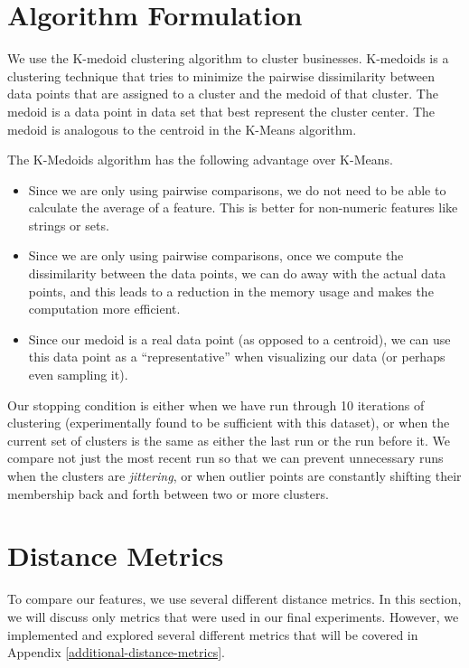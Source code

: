 \documentclass{article}
\begin{document}
\section{Algorithm Formulation}
We use the K-medoid clustering algorithm to cluster businesses.
K-medoids is a clustering technique that tries to minimize the pairwise dissimilarity between data points that are assigned to a cluster and the medoid of that cluster.
The medoid is a data point in data set that best represent the cluster center.
The medoid is analogous to the centroid in the K-Means algorithm.

The K-Medoids algorithm has the following advantage over K-Means.
\begin{itemize} 
	\setlength\itemsep{0.1cm}
	\item Since we are only using pairwise comparisons, we do not need to be able to calculate the average of a feature. This is better for non-numeric features like strings or sets.
    \item Since we are only using pairwise comparisons, once we compute the dissimilarity between the data points, we can do away with the actual data points, and this leads to a reduction in the memory usage and makes the computation more efficient.
    \item Since our medoid is a real data point (as opposed to a centroid), we can use this data point as a ``representative'' when visualizing our data (or perhaps even sampling it).
\end{itemize}

Our stopping condition is either when we have run through 10 iterations of clustering (experimentally found to be sufficient with this dataset), or when the current set of clusters is the same as either the last run or the run before it.
We compare not just the most recent run so that we can prevent unnecessary runs when the clusters are \textit{jittering}, or when outlier points are constantly shifting their membership back and forth between two or more clusters.

\section{Distance Metrics}
To compare our features, we use several different distance metrics.
In this section, we will discuss only metrics that were used in our final experiments.
However, we implemented and explored several different metrics that will be covered in Appendix \ref{additional-distance-metrics}.
\end{document}
